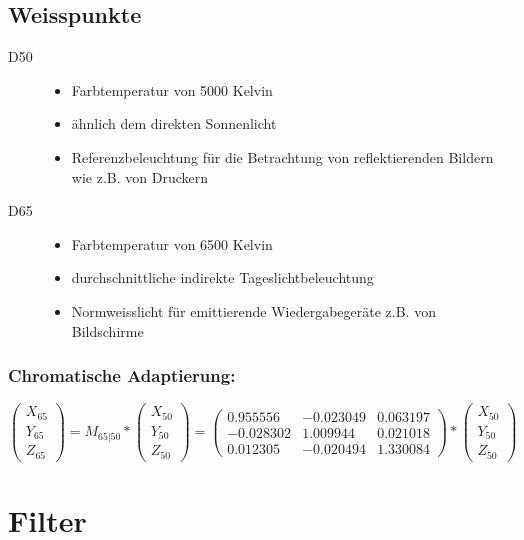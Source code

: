 \documentclass[10pt]{article}
\begin{document}
\subsection{Weisspunkte}
\begin{description}
	\item[D50] \hfill
		\begin{itemize}
			\item Farbtemperatur von 5000 Kelvin
			\item ähnlich dem direkten Sonnenlicht
			\item Referenzbeleuchtung für die Betrachtung von reflektierenden Bildern wie z.B. von Druckern
		\end{itemize}
	\item[D65] \hfill
		\begin{itemize}
			\item Farbtemperatur von 6500 Kelvin
			\item durchschnittliche indirekte Tageslichtbeleuchtung
			\item Normweisslicht für emittierende Wiedergabegeräte z.B. von Bildschirme
		\end{itemize}
\end{description}
\subsubsection*{Chromatische Adaptierung:}
\begin{equation*}
	\begin{pmatrix} X_{65} \\ Y_{65} \\ Z_{65} \end{pmatrix} = M_{65|50} * \begin{pmatrix} X_{50} \\ Y_{50} \\ Z_{50} \end{pmatrix}   =\begin{pmatrix} 0.955556 & -0.023049 & 0.063197 \\ -0.028302 & 1.009944 & 0.021018 \\ 0.012305 & -0.020494 & 1.330084\end{pmatrix} * \begin{pmatrix} X_{50} \\ Y_{50} \\ Z_{50} \end{pmatrix} 
\end{equation*}

\pagebreak
\section{Filter}
\end{document}
